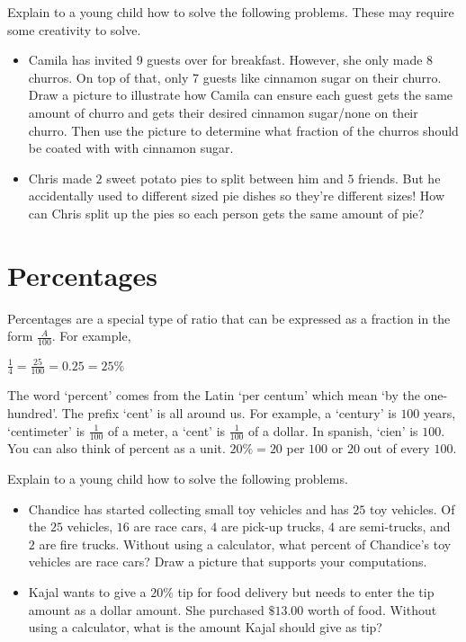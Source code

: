 \documentclass{ximera}
\begin{document}
\begin{exploration}
Explain to a young child how to solve the following problems. These may require some creativity to solve.
\begin{itemize}
\item Camila has invited 9 guests over for breakfast. However, she only made 8 churros. On top of that, only 7 guests like cinnamon sugar on their churro.  Draw a picture to illustrate how Camila can ensure each guest gets the same amount of churro and gets their desired cinnamon sugar/none on their churro. Then use the picture to determine what fraction of the churros should be coated with with cinnamon sugar.
\item Chris made $2$ sweet potato pies to split between him and $5$ friends. But he accidentally used to different sized pie dishes so they're different sizes! How can Chris split up the pies so each person gets the same amount of pie?
\end{itemize}
\end{exploration}

\section{Percentages}
Percentages are a special type of ratio that can be expressed as a fraction in the form $\frac{A}{100}$.  For example,
\begin{center} $\frac{1}{4} = \frac{25}{100} = 0.25=25\%$ \end{center}

The word `percent' comes from the Latin `per centum' which mean `by the one-hundred'. The prefix `cent' is all around us. For example, a `century' is $100$ years, `centimeter' is $\frac{1}{100}$ of a meter, a `cent' is $\frac{1}{100}$ of a dollar. In spanish, `cien' is $100$. You can also think of percent as a unit. $20\%= 20$ per $100$ or $20$ out of every $100$. \\



\begin{exploration}
Explain to a young child how to solve the following problems.
\begin{itemize} 
\item Chandice has started collecting small toy vehicles and has $25$ toy vehicles. Of the $25$ vehicles, $16$ are race cars, $4$ are pick-up trucks, $4$ are semi-trucks, and $2$ are fire trucks.  Without using a calculator, what percent of Chandice's toy vehicles are race cars? Draw a picture that supports your computations.
\item Kajal wants to give a $20\%$ tip for food delivery but needs to enter the tip amount as a dollar amount. She purchased $\$13.00$ worth of food. Without using a calculator, what is the amount Kajal should give as tip?
\end{itemize}
\end{exploration} 
\end{document}
